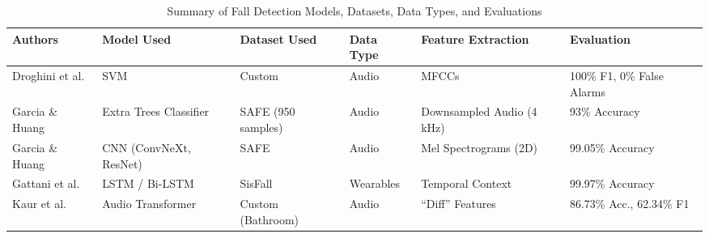 \documentclass[11pt, a4paper, twoside]{article}
\begin{document}
\begin{table}[h!]
\centering
\small %
\caption{Summary of Fall Detection Models, Datasets, Data Types, and Evaluations}
\label{tab:fall_detection_summary}
\renewcommand{\arraystretch}{1.5} %
\begin{tabularx}{\textwidth}{|p{2.5cm}|X|p{2.2cm}|p{1.5cm}|X|p{2.5cm}|}
\hline
\textbf{Authors} & \textbf{Model Used} & \textbf{Dataset Used} & \textbf{Data Type} & \textbf{Feature Extraction} & \textbf{Evaluation} \\
\hline
Droghini et al. \cite{Droghini2016}
& SVM
& Custom
& Audio
& MFCCs
& 100\% F1, 0\% False Alarms \\
\hline
Garcia \& Huang \cite{Garcia2025SAFE}
& Extra Trees Classifier
& SAFE (950 samples)
& Audio
& Downsampled Audio (4 kHz)
& 93\% Accuracy \\
\hline
Garcia \& Huang \cite{Garcia2025SAFE}
& CNN (ConvNeXt, ResNet)
& SAFE
& Audio
& Mel Spectrograms (2D)
& 99.05\% Accuracy \\
\hline
Gattani et al. \cite{Gattani2026}
& LSTM / Bi-LSTM
& SisFall
& Wearables
& Temporal Context
& 99.97\% Accuracy \\
\hline
Kaur et al. \cite{Kaur2022}
& Audio Transformer
& Custom (Bathroom)
& Audio
& ``Diff'' Features
& 86.73\% Acc., 62.34\% F1 \\
\hline
\end{tabularx}
\end{table}
\end{document}
